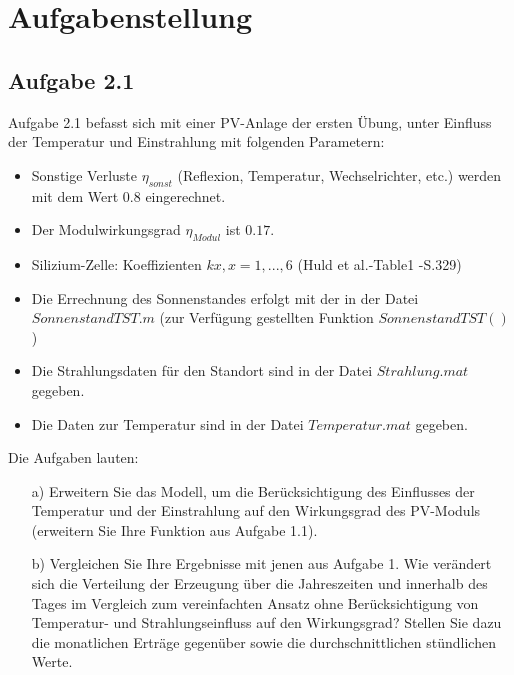 \documentclass[a4paper,12pt]{article}
\begin{document}
	
	
	\newpage
	\tableofcontents
	
	\newpage
	\section{Aufgabenstellung}
	\subsection{Aufgabe 2.1}
	Aufgabe 2.1 befasst sich mit einer PV-Anlage der ersten Übung, unter Einfluss der Temperatur und Einstrahlung mit folgenden Parametern:
	\begin{itemize}
		\item Sonstige Verluste $\eta_{sonst}$ (Reflexion, Temperatur, Wechselrichter, etc.) werden mit dem Wert $0.8$ eingerechnet.				\item Der Modulwirkungsgrad $\eta_{Modul}$ ist $0.17$.
		\item Silizium-Zelle: Koeffizienten $kx, x = 1, ... , 6$ (Huld et al.-Table1 -S.329)
		\item Die Errechnung des Sonnenstandes erfolgt mit der in der Datei $SonnenstandTST.m$ (zur Verfügung gestellten Funktion $SonnenstandTST()$ 	)				\item Die Strahlungsdaten für den Standort sind in der Datei $Strahlung.mat$ gegeben.
		\item Die Daten zur Temperatur sind in der Datei $Temperatur.mat$ gegeben.
	\end{itemize}
	Die Aufgaben lauten:
	\begin{itemize}
		\item[a)] Erweitern Sie das Modell, um die Berücksichtigung des Einflusses der Temperatur und der
Einstrahlung auf den Wirkungsgrad des PV-Moduls (erweitern Sie Ihre Funktion aus
Aufgabe 1.1).
		\item[b)] Vergleichen Sie Ihre Ergebnisse mit jenen aus Aufgabe 1. Wie verändert sich die Verteilung
der Erzeugung über die Jahreszeiten und innerhalb des Tages im Vergleich zum
vereinfachten Ansatz ohne Berücksichtigung von Temperatur- und Strahlungseinfluss auf
den Wirkungsgrad? Stellen Sie dazu die monatlichen Erträge gegenüber sowie die
durchschnittlichen stündlichen Werte.
	\end{itemize}
\end{document}

